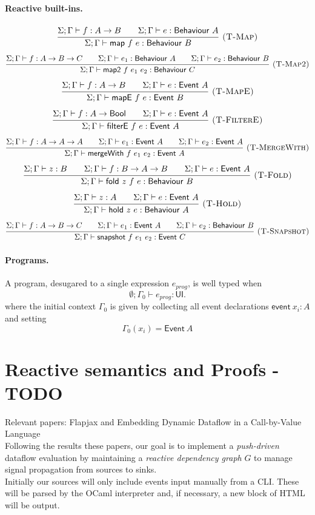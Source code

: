 \documentclass{article}
\makeatletter
\newcommand{\kw}[1]{\mathsf{#1}}
\newcommand{\rul}[3]{\[\dfrac{\begin{array}{@{}c@{}}#2\end{array}}{\begin{array}{@{}c@{}}#3\end{array}}\ \textsc{#1}\]}
\newcommand{\tj}{\Sigma;\Gamma \vdash}   %
\makeatother
\begin{document}
\paragraph{Reactive built-ins.}
\rul{(T-Map)}{\tj f : A \to B \qquad \tj e : \kw{Behaviour}\ A}{\tj \kw{map}\ f\ e : \kw{Behaviour}\ B}
\rul{(T-Map2)}{\tj f : A \to B \to C \qquad \tj e_1 : \kw{Behaviour}\ A \qquad \tj e_2 : \kw{Behaviour}\ B}
{\tj \kw{map2}\ f\ e_1\ e_2 : \kw{Behaviour}\ C}
\rul{(T-MapE)}{\tj f : A \to B \qquad \tj e : \kw{Event}\ A}{\tj \kw{mapE}\ f\ e : \kw{Event}\ B}
\rul{(T-FilterE)}{\tj f : A \to \kw{Bool} \qquad \tj e : \kw{Event}\ A}{\tj \kw{filterE}\ f\ e : \kw{Event}\ A}
\rul{(T-MergeWith)}{\tj f : A \to A \to A \qquad \tj e_1 : \kw{Event}\ A \qquad \tj e_2 : \kw{Event}\ A}
{\tj \kw{mergeWith}\ f\ e_1\ e_2 : \kw{Event}\ A}
\rul{(T-Fold)}{\tj z : B \qquad \tj f : B \to A \to B \qquad \tj e : \kw{Event}\ A}
{\tj \kw{fold}\ z\ f\ e : \kw{Behaviour}\ B}
\rul{(T-Hold)}{\tj z : A \qquad \tj e : \kw{Event}\ A}{\tj \kw{hold}\ z\ e : \kw{Behaviour}\ A}
\rul{(T-Snapshot)}{\tj f : A \to B \to C \qquad \tj e_1 : \kw{Event}\ A \qquad \tj e_2 : \kw{Behaviour}\ B}
{\tj \kw{snapshot}\ f\ e_1\ e_2 : \kw{Event}\ C}

\paragraph{Programs.} A program, desugared to a single expression $e_{\mathit{prog}}$, is well typed when
\[ \emptyset;\Gamma_0 \vdash e_{\mathit{prog}} : \kw{UI}. \]
where the initial context $ \Gamma_0 $ is given by collecting all event declarations $ \kw{event}\ x_i : A $ and setting
\[
  \Gamma_0(x_i) = \kw{Event}\ A
\]
\section{Reactive semantics and Proofs - TODO}

Relevant papers:  Flapjax\cite{meyerovich:flapjax} and Embedding Dynamic Dataflow in a Call-by-Value Language\cite{10.1007/11693024_20}\\

Following the results these papers, our goal is to implement a \textit{push-driven} dataflow evaluation by maintaining a \textit{reactive dependency graph} $ G $ to manage signal propagation from sources to sinks.\\

Initially our sources will only include events input manually from a CLI. These will be parsed by the OCaml interpreter and, if necessary, a new block of HTML will be output.\\
\end{document}
